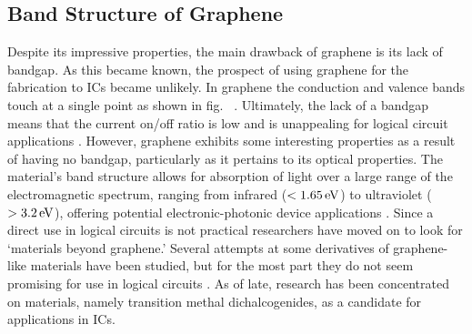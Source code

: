 \subsection{Band Structure of Graphene}\label{subsec:graphene_bandstructure}
\noindent Despite its impressive properties, the main drawback of graphene is its lack of bandgap. As this became known, the prospect of using graphene for the fabrication to \acp{IC} became unlikely. In graphene the conduction and valence bands touch at a single point as shown in fig.~ \cite{Wallace_PhysRev1947}. Ultimately, the lack of a bandgap means that the current on/off ratio is low and is unappealing for logical circuit applications \cite{Xu_ChemRev2013}. However, graphene exhibits some interesting properties as a result of having no bandgap, particularly as it pertains to its optical properties. The material's band structure allows for absorption of light over a large range of the electromagnetic spectrum, ranging from infrared ($<1.65\,\mathrm{eV}$) to ultraviolet ($>3.2\,\mathrm{eV}$), offering potential electronic-photonic device applications \cite{Xia_NatureNano2009,Wang_Science2008,Geim_NatureComm2011}. Since a direct use in logical circuits is not practical researchers have moved on to look for `\td materials beyond graphene.' Several attempts at some derivatives of graphene-like materials have been studied, but for the most part they do not seem promising for use in logical circuits \cite{Takeda_PhysRev1994,Cahangirov_PhysRevLett2009}. As of late, research has been concentrated on \td materials, namely transition methal dichalcogenides, as a candidate for applications in \acp{IC}.

